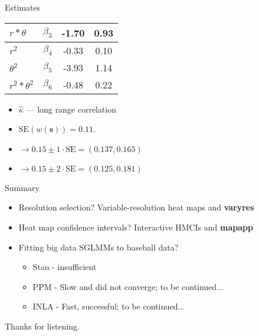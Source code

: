 \documentclass{beamer}
\begin{document}
\begin{frame}{Estimates}
\begin{table}
{\begin{tabular}{| l | c | c | c |}
$r*\theta$        & $\beta_{3}$ & -1.70 & 0.93 \\ \hline
$r^{2}$           & $\beta_{4}$ & -0.33 & 0.10 \\ \hline
$\theta^{2}$      & $\beta_{5}$ & -3.93 & 1.14 \\ \hline
$r^{2}*\theta^{2}$& $\beta_{6}$ & -0.48 & 0.22 \\ \hline
\end{tabular}
}
\end{table}
\begin{itemize}
\item $\hat{\kappa}$ --- long range correlation
\item $\text{SE}(w(\pmb{s})) = 0.11$.
\item $\rightarrow 0.15 \pm 1 \cdot \text{SE} = (0.137, 0.165)$
\item $\rightarrow 0.15 \pm 2 \cdot \text{SE} = (0.125, 0.181)$
\end{itemize}
\end{frame}

\begin{frame}{Summary}
\begin{itemize}
\addtolength{\itemsep}{0.5\baselineskip}
\item Resolution selection? Variable-resolution heat maps and {\bf varyres}
\item Heat map confidence intervals? Interactive HMCIs and {\bf mapapp}
\item Fitting big data SGLMMs to baseball data?
  \begin{itemize}
  \addtolength{\itemsep}{0.5\baselineskip}
  \item Stan - insufficient
  \item PPM - Slow and did not converge; to be continued...
  \item INLA - Fast, successful; to be continued...
  \end{itemize}
\end{itemize}
\end{frame}

%
%
%
\begin{frame}{}
\begin{center}
\Huge{Thanks for listening.}
\end{center}
\end{frame}


\end{document}
